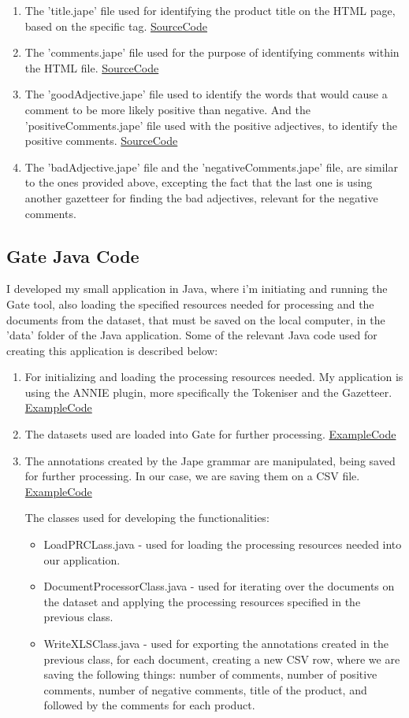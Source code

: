 \documentclass[a4paper,12pt]{report}
\begin{document}
  \begin{enumerate}
   \item The 'title.jape' file used for identifying the product title on the HTML page, based on the specific tag.  \hyperref[sec:jape1]{SourceCode}
   \item The 'comments.jape' file used for the purpose of identifying comments within the HTML file. \hyperref[sec:jape2]{SourceCode}
   \item The 'goodAdjective.jape' file used to identify the words that would cause a comment to be more likely positive than negative. And the 'positiveComments.jape' file used with the positive adjectives, to identify the positive comments. \hyperref[sec:jape3]{SourceCode}
   \item The 'badAdjective.jape' file and the 'negativeComments.jape' file, are similar to the ones provided above, excepting the fact that the last one is using another gazetteer for finding the bad adjectives, relevant for the negative comments.
  \end{enumerate}
\subsection{Gate Java Code}
  I developed my small application in Java, where i'm initiating and running the Gate tool, also loading the specified resources needed for processing and the documents from the dataset, that must be saved on the local computer, in the 'data' folder of the Java application.
  Some of the relevant Java code used for creating this application is described below:
  \begin{enumerate}
   \item For initializing and loading the processing resources needed. My application is using the ANNIE plugin, more specifically the Tokeniser and the Gazetteer. \hyperref[sec:java1]{ExampleCode}
   \item The datasets used are loaded into Gate for further processing. \hyperref[sec:java2]{ExampleCode}
   \item The annotations created by the Jape grammar are manipulated, being saved for further processing. In our case, we are saving them on a CSV file. \hyperref[sec:java3]{ExampleCode}
 
    The classes used for developing the functionalities:
    \begin{itemize}
      \item LoadPRCLass.java - used for loading the processing resources needed into our application.
      \item DocumentProcessorClass.java  - used for iterating over the documents on the dataset and applying the processing resources specified in the previous class.
      \item WriteXLSClass.java - used for exporting the annotations created in the previous class, for each document, creating a new CSV row, where we are saving the following things: number of comments, number of positive comments, number of negative comments, title of the product, and followed by the comments for each product.
    \end{itemize}

 \end{enumerate}
\end{document}
